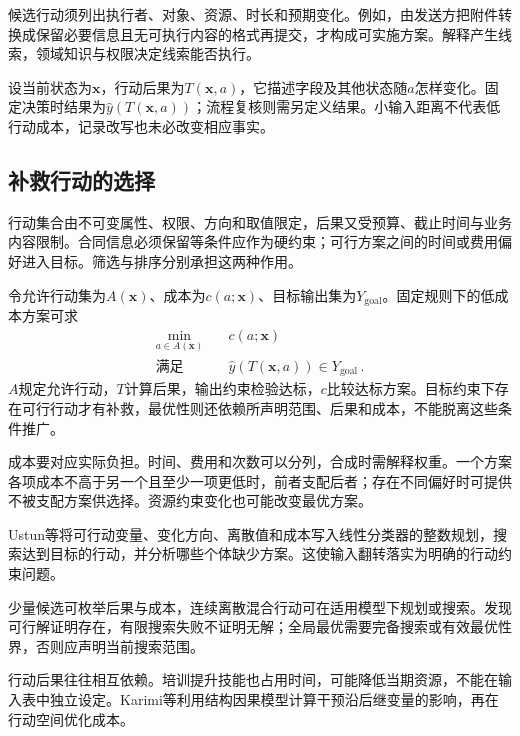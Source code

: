 候选行动须列出执行者、对象、资源、时长和预期变化。例如，由发送方把附件转换成保留必要信息且无可执行内容的格式再提交，才构成可实施方案。解释产生线索，领域知识与权限决定线索能否执行。

设当前状态为$\bm x$，行动后果为$T(\bm x,a)$，它描述字段及其他状态随$a$怎样变化。固定决策时结果为$\hat y(T(\bm x,a))$；流程复核则需另定义结果。小输入距离不代表低行动成本，记录改写也未必改变相应事实。

\subsection{补救行动的选择}
\label{sec:interpretability-recourse-action}

行动集合由不可变属性、权限、方向和取值限定，后果又受预算、截止时间与业务内容限制。合同信息必须保留等条件应作为硬约束；可行方案之间的时间或费用偏好进入目标。筛选与排序分别承担这两种作用。

令允许行动集为$A(\bm x)$、成本为$c(a;\bm x)$、目标输出集为$Y_{\mathrm{goal}}$。固定规则下的低成本方案可求
\begin{equation}
 \begin{aligned}
 \min_{a\in A(\bm{x})}\quad &c(a;\bm{x})\\
 \text{满足}\quad &\hat y(T(\bm{x},a))\in Y_{\mathrm{goal}}\, .
 \end{aligned}
 \label{eq:interpretability-recourse}
\end{equation}
$A$规定允许行动，$T$计算后果，输出约束检验达标，$c$比较达标方案。目标约束下存在可行行动才有补救，最优性则还依赖所声明范围、后果和成本，不能脱离这些条件推广。

成本要对应实际负担。时间、费用和次数可以分列，合成时需解释权重。一个方案各项成本不高于另一个且至少一项更低时，前者支配后者；存在不同偏好时可提供不被支配方案供选择。资源约束变化也可能改变最优方案。

Ustun等将可行动变量、变化方向、离散值和成本写入线性分类器的整数规划，搜索达到目标的行动，并分析哪些个体缺少方案。这使输入翻转落实为明确的行动约束问题。

少量候选可枚举后果与成本，连续离散混合行动可在适用模型下规划或搜索。发现可行解证明存在，有限搜索失败不证明无解；全局最优需要完备搜索或有效最优性界，否则应声明当前搜索范围。

行动后果往往相互依赖。培训提升技能也占用时间，可能降低当期资源，不能在输入表中独立设定。Karimi等利用结构因果模型计算干预沿后继变量的影响，再在行动空间优化成本。

